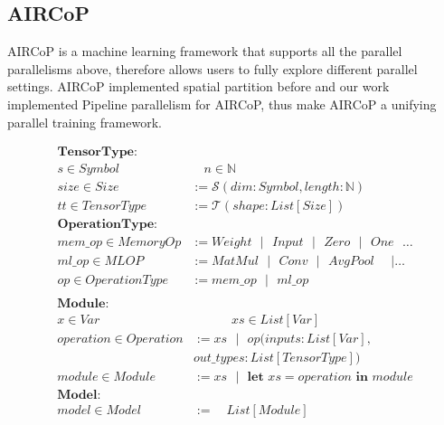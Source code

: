 \documentclass[sigplan, nonacm]{acmart}\settopmatter{printfolios=true,printccs=false,printacmref=false}
\begin{document}
\subsection{AIRCoP}
 AIRCoP \cite{aircopfeiwang} is a machine learning framework that supports all the parallel parallelisms above, therefore allows users to fully explore different parallel settings. AIRCoP implemented spatial partition before and our work implemented Pipeline parallelism for AIRCoP, thus make AIRCoP a unifying parallel training framework.\par
\begin{align*}\label{formalsyntax}
  \textbf{TensorType}:& \\
  s \in Symbol& \quad n  \in \mathbb{N} \\
  size \in Size& :=\mathcal{S}(dim:Symbol,length:\mathbb{N})\\
  tt\in TensorType& := \mathcal{T}(shape:List[Size])\\
  \textbf{OperationType}:& \\
  mem\_op\in MemoryOp& := Weight \text{ } | \text{ } Input \text{ } | \text{ } Zero \text{ } | \text{ } One \text{ } \dots \\
  ml\_op \in MLOP& := MatMul \text{ } | \text{ } Conv \text{ } | \text{ } AvgPool \text{ }\text{ } | \dots \\
  op \in OperationType&:= mem\_op \text{ } | \text{ } ml\_op \\
\end{align*}
\begin{align*}
  \textbf{Module}:& \\
  x \in Var& \quad \quad \quad xs \in List[Var]\\
  operation \in Operation&:= xs \text{ } | \text{ } op(inputs: List[Var], \\
  & out\_types:List[TensorType]) \\
  module \in Module&:=xs \text{ } | \text{ } \textbf{let } xs=operation \textbf{ in } module \\
  \textbf{Model}:&\\
  model \in Model&:= \quad List[Module]
\end{align*}
\end{document}
